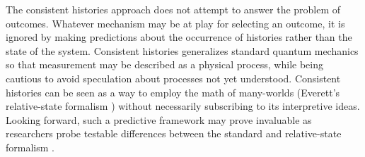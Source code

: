 The consistent histories approach does not attempt to answer the problem of outcomes. Whatever mechanism may be at play for selecting an  outcome, it is ignored by making predictions about the occurrence of histories rather than the state of the system. Consistent histories generalizes standard quantum mechanics so that measurement may be described as a physical process, while being cautious to avoid speculation about processes not yet understood. Consistent histories can be seen as a way to employ the math of many-worlds (Everett's relative-state formalism \cite{everett}) without necessarily subscribing to its interpretive ideas. Looking forward, such a predictive framework may prove invaluable as researchers probe testable differences between the standard and relative-state formalism \cite{baumann, proietti}.
